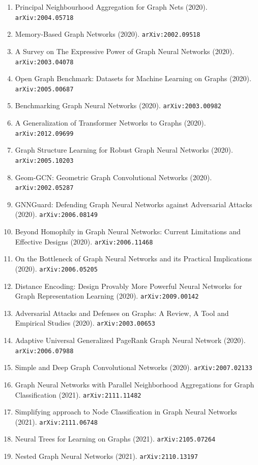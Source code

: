 \documentclass[11pt]{article}
\begin{document}
\begin{enumerate}
  \item Principal Neighbourhood Aggregation for Graph Nets (2020). \texttt{arXiv:2004.05718}
  \item Memory-Based Graph Networks (2020). \texttt{arXiv:2002.09518}
  \item A Survey on The Expressive Power of Graph Neural Networks (2020). \texttt{arXiv:2003.04078}
  \item Open Graph Benchmark: Datasets for Machine Learning on Graphs (2020). \texttt{arXiv:2005.00687}
  \item Benchmarking Graph Neural Networks (2020). \texttt{arXiv:2003.00982}
  \item A Generalization of Transformer Networks to Graphs (2020). \texttt{arXiv:2012.09699}
  \item Graph Structure Learning for Robust Graph Neural Networks (2020). \texttt{arXiv:2005.10203}
  \item Geom-GCN: Geometric Graph Convolutional Networks (2020). \texttt{arXiv:2002.05287}
  \item GNNGuard: Defending Graph Neural Networks against Adversarial Attacks (2020). \texttt{arXiv:2006.08149}
  \item Beyond Homophily in Graph Neural Networks: Current Limitations and
  Effective Designs (2020). \texttt{arXiv:2006.11468}
  \item On the Bottleneck of Graph Neural Networks and its Practical
  Implications (2020). \texttt{arXiv:2006.05205}
  \item Distance Encoding: Design Provably More Powerful Neural Networks for
  Graph Representation Learning (2020). \texttt{arXiv:2009.00142}
  \item Adversarial Attacks and Defenses on Graphs: A Review, A Tool and
  Empirical Studies (2020). \texttt{arXiv:2003.00653}
  \item Adaptive Universal Generalized PageRank Graph Neural Network (2020). \texttt{arXiv:2006.07988}
  \item Simple and Deep Graph Convolutional Networks (2020). \texttt{arXiv:2007.02133}
  \item Graph Neural Networks with Parallel Neighborhood Aggregations for Graph
  Classification (2021). \texttt{arXiv:2111.11482}
  \item Simplifying approach to Node Classification in Graph Neural Networks (2021). \texttt{arXiv:2111.06748}
  \item Neural Trees for Learning on Graphs (2021). \texttt{arXiv:2105.07264}
  \item Nested Graph Neural Networks (2021). \texttt{arXiv:2110.13197}

\end{enumerate}
\end{document}
